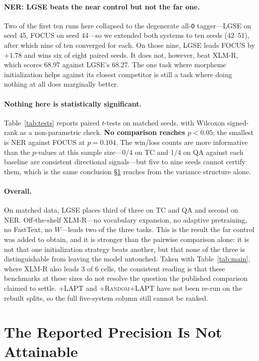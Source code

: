 \documentclass[11pt]{article}
\begin{document}
\paragraph{NER: LGSE beats the near control but not the far one.} Two of the
first ten runs here collapsed to the degenerate all-\texttt{O} tagger---LGSE
on seed 45, FOCUS on seed 44---so we extended both systems to ten seeds
(42--51), after which nine of ten converged for each. On those nine, LGSE
leads FOCUS by $+1.78$ and wins six of eight paired seeds. It does not,
however, beat XLM-R, which scores 68.97 against LGSE's 68.27. The one task
where morpheme initialization helps against its closest competitor is still a
task where doing nothing at all does marginally better.

\paragraph{Nothing here is statistically significant.} Table~\ref{tab:tests}
reports paired $t$-tests on matched seeds, with Wilcoxon signed-rank as a
non-parametric check. \textbf{No comparison reaches $p < 0.05$}; the smallest
is NER against FOCUS at $p = 0.104$. The win/loss counts are more
informative than the $p$-values at this sample size---0/4 on TC and 1/4 on
QA against each baseline are consistent directional signals---but five to
nine seeds cannot certify them, which is the same conclusion
\S\ref{sec:variance} reaches from the variance structure alone.

\paragraph{Overall.} On matched data, LGSE places third of three on TC and
QA and second on NER. Off-the-shelf XLM-R---no vocabulary expansion, no
adaptive pretraining, no FastText, no $W$---leads two of the three tasks.
This is the result the far control was added to obtain, and it is stronger
than the pairwise comparison alone: it is not that one initialization
strategy beats another, but that none of the three is distinguishable from
leaving the model untouched. Taken with Table~\ref{tab:main}, where XLM-R
also leads 3 of 6 cells, the consistent reading is that these benchmarks at
these sizes do not resolve the question the published comparison claimed to
settle. \textsc{+LAPT} and \textsc{+Random+LAPT} have not been re-run on the
rebuilt splits, so the full five-system column still cannot be ranked.

\section{The Reported Precision Is Not Attainable}
\label{sec:variance}
\end{document}
